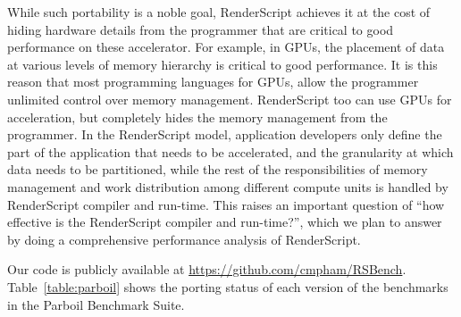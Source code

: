 While such portability is a noble goal, RenderScript achieves it at the cost of
hiding hardware details from the programmer that are critical to good
performance on these accelerator. For example, in GPUs, the placement of data at
various levels of memory hierarchy is critical to good performance.  It is this
reason that most programming languages for GPUs, allow the programmer unlimited
control over memory management. RenderScript too can use GPUs for acceleration,
but completely hides the memory management from the programmer. In the
RenderScript model, application developers only define the part of the
application that needs to be accelerated, and the granularity at which data
needs to be partitioned, while the rest of the responsibilities of memory
management and work distribution among different compute units is handled by
RenderScript compiler and run-time.  This raises an important question of ``how
effective is the RenderScript compiler and run-time?'', which we plan to answer
by doing a comprehensive performance analysis of RenderScript.

Our code is publicly available at \url{https://github.com/cmpham/RSBench}.
Table~\ref{table:parboil} shows the porting status of each version of the
benchmarks in the Parboil Benchmark Suite.


